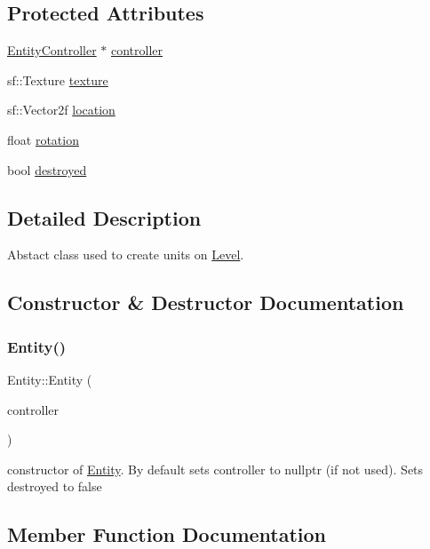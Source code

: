 \subsection*{Protected Attributes}
\begin{DoxyCompactItemize}
\item 
\mbox{\hyperlink{class_entity_controller}{Entity\+Controller}} $\ast$ \mbox{\hyperlink{class_entity_aae95fabac07322ac31d03b582f74f393}{controller}}
\item 
sf\+::\+Texture \mbox{\hyperlink{class_entity_ad64dd6d282432a68475f30f7c7bbdc88}{texture}}
\item 
sf\+::\+Vector2f \mbox{\hyperlink{class_entity_a5b94ee2356d46ca6852e2807c3701133}{location}}
\item 
float \mbox{\hyperlink{class_entity_aa384ccfdaba36b1ff5f5db51ec3cdcb1}{rotation}}
\item 
bool \mbox{\hyperlink{class_entity_a0ff0afc330fd03bb82e596dae58a6210}{destroyed}}
\end{DoxyCompactItemize}


\subsection{Detailed Description}
Abstact class used to create units on \mbox{\hyperlink{class_level}{Level}}. 

\subsection{Constructor \& Destructor Documentation}
\mbox{\label{class_entity_ab076af15dcbbda1a1f6ef0da746919fb}} 
\subsubsection{\texorpdfstring{Entity()}{Entity()}}
{\footnotesize\ttfamily Entity\+::\+Entity (\begin{DoxyParamCaption}\item[{\mbox{\hyperlink{class_entity_controller}{Entity\+Controller}} $\ast$}]{controller }\end{DoxyParamCaption})}

constructor of \mbox{\hyperlink{class_entity}{Entity}}. By default sets controller to nullptr (if not used). Sets destroyed to false 

\subsection{Member Function Documentation}
\mbox{\label{class_entity_aa75151fc607686b42d27f8c3ba73143d}} 
